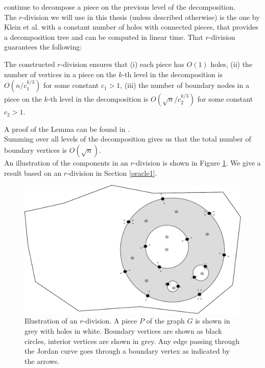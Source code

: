 continue to decompose a piece on the previous level of the decomposition.
\\
The $r$-division we will use in this thesis (unless described otherwise) is the one by Klein et al.
\cite{klein2013structured} with a constant number of
holes with connected pieces, that provides a decomposition tree and can be computed in
linear time. That $r$-division guarantees the following:
\begin{lemma}\label{rdivlemma}
  The constructed $r$-division ensures that (i) each piece has $O(1)$ holes, (ii) the
  number of vertices in a piece on the $k$-th level in the decomposition is
  $O(n/c_1^{k/3})$ for some constant $c_1>1$, (iii) the number of boundary nodes in a
  piece on the $k$-th level in the decomposition is $O(\sqrt{n}/c_2^{k/3})$ for some
  constant $c_2>1$.
\end{lemma}
\noindent A proof of the Lemma can be found in \cite{klein2013structured}. \\
Summing over all levels of the decomposition gives us that the total number of boundary
vertices is $O(\sqrt{n})$.\\
An illustration of the components in an $r$-division is shown in Figure \ref{rdiv}. We give
a result based on an $r$-division in Section \ref{oracle1}.

\begin{figure}[h!]
  \includegraphics[width=1.0\textwidth]{figs/rdiv.pdf}
  \caption{Illustration of an $r$-division. A piece $P$ of the graph $G$ is shown in
  grey with holes in white. Boundary vertices are shown as black circles, interior vertices are shown in
grey. Any edge passing through the Jordan curve goes through a boundary vertex as
indicated by the arrows.}
    \label{rdiv}
\end{figure}

